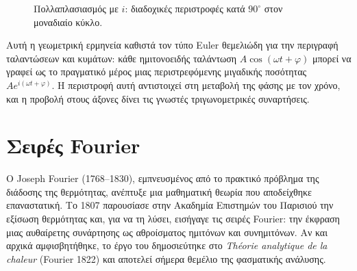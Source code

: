 \begin{figure}[htbp]
\centering
{}
\caption{Πολλαπλασιασμός με $i$: διαδοχικές περιστροφές κατά $90^\circ$ στον μοναδιαίο κύκλο.}
\label{fig:i_rotation}
\end{figure}

Αυτή η γεωμετρική ερμηνεία καθιστά τον τύπο Euler θεμελιώδη για την
περιγραφή ταλαντώσεων και κυμάτων: κάθε ημιτονοειδής ταλάντωση
\(A\cos(\omega t + \varphi)\) μπορεί να γραφεί ως το πραγματικό μέρος
μιας περιστρεφόμενης μιγαδικής ποσότητας
\(A e^{i(\omega t + \varphi)}\). Η περιστροφή αυτή αντιστοιχεί στη
μεταβολή της φάσης με τον χρόνο, και η προβολή στους άξονες δίνει τις
γνωστές τριγωνομετρικές συναρτήσεις.

\section{Σειρές Fourier}\label{ux3c3ux3b5ux3b9ux3c1ux3adux3c2-fourier}

Ο Joseph Fourier (1768--1830), εμπνευσμένος από το πρακτικό πρόβλημα της
διάδοσης της θερμότητας, ανέπτυξε μια μαθηματική θεωρία που αποδείχθηκε
επαναστατική. Το 1807 παρουσίασε στην Ακαδημία Επιστημών του Παρισιού
την εξίσωση θερμότητας και, για να τη λύσει, εισήγαγε τις σειρές
Fourier: την έκφραση μιας αυθαίρετης συνάρτησης ως αθροίσματος ημιτόνων
και συνημιτόνων. Αν και αρχικά αμφισβητήθηκε, το έργο του δημοσιεύτηκε
στο \emph{Théorie analytique de la chaleur} (Fourier 1822) και αποτελεί
σήμερα θεμέλιο της φασματικής ανάλυσης.

